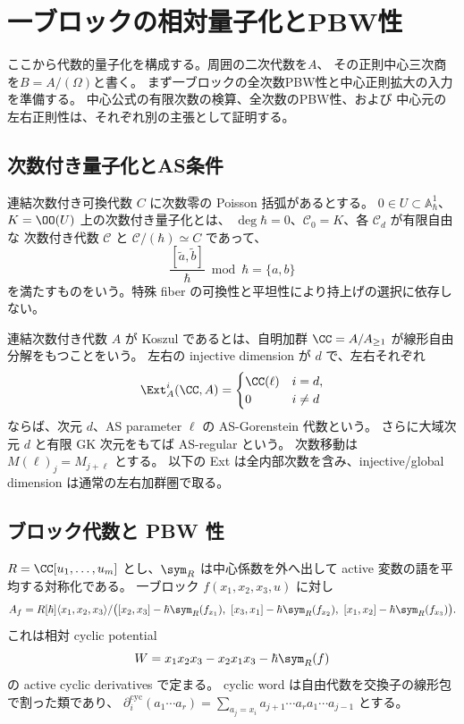 \section{一ブロックの相対量子化とPBW性}
\label{sec:pg-quantization-foundations}
ここから代数的量子化を構成する。周囲の二次代数を$A$、
その正則中心三次商を$B=A/(\Omega)$と書く。
まず一ブロックの全次数PBW性と中心正則拡大の入力を準備する。
中心公式の有限次数の検算、全次数のPBW性、および
中心元の左右正則性は、それぞれ別の主張として証明する。

\subsection{次数付き量子化とAS条件}

\begin{definition}
連結次数付き可換代数 $C$ に次数零の Poisson 括弧があるとする。
$0\in U\subset\mathbb A^1_\hbar$、$K=\OO(U)$ 上の次数付き量子化とは、
$\deg\hbar=0$、$\mathcal C_0=K$、各 $\mathcal C_d$ が有限自由な
次数付き代数 $\mathcal C$ と $\mathcal C/(\hbar)\simeq C$ であって、
\begin{equation}
\frac{[\widetilde a,\widetilde b]}\hbar\bmod\hbar=\{a,b\}
\end{equation}
を満たすものをいう。特殊 fiber の可換性と平坦性により持上げの選択に依存しない。
\end{definition}
連結次数付き代数 $A$ が Koszul であるとは、自明加群 $\CC=A/A_{\geq1}$ が線形自由分解をもつことをいう。
左右の injective dimension が $d$ で、左右それぞれ
\begin{equation}
\Ext_A^i(\CC,A)=
\begin{cases}\CC(\ell)&i=d,\\0&i\neq d\end{cases}
\end{equation}
ならば、次元 $d$、AS parameter $\ell$ の AS-Gorenstein 代数という。
さらに大域次元 $d$ と有限 GK 次元をもてば AS-regular という。
次数移動は $M(\ell)_j=M_{j+\ell}$ とする。
以下の Ext は全内部次数を含み、injective/global dimension は通常の左右加群圏で取る。

\subsection{ブロック代数と PBW 性}
$R=\CC[u_1,\ldots,u_m]$ とし、$\sym_R$ は中心係数を外へ出して active 変数の語を平均する対称化である。
一ブロック $f(x_1,x_2,x_3,u)$ に対し
\begin{equation}
A_f=R[\hbar]\langle x_1,x_2,x_3\rangle/
\bigl([x_2,x_3]-\hbar\sym_R(f_{x_1}),\ [x_3,x_1]-\hbar\sym_R(f_{x_2}),\
[x_1,x_2]-\hbar\sym_R(f_{x_3})\bigr).\label{eq:pg-block-algebra}
\end{equation}
これは相対 cyclic potential
\begin{equation}
W=x_1x_2x_3-x_2x_1x_3-\hbar\sym_R(f)\label{eq:pg-potential}
\end{equation}
の active cyclic derivatives で定まる。
cyclic word は自由代数を交換子の線形包で割った類であり、
$\partial_i^{\mathrm{cyc}}(a_1\cdots a_r)
=\sum_{a_j=x_i}a_{j+1}\cdots a_ra_1\cdots a_{j-1}$ とする。

